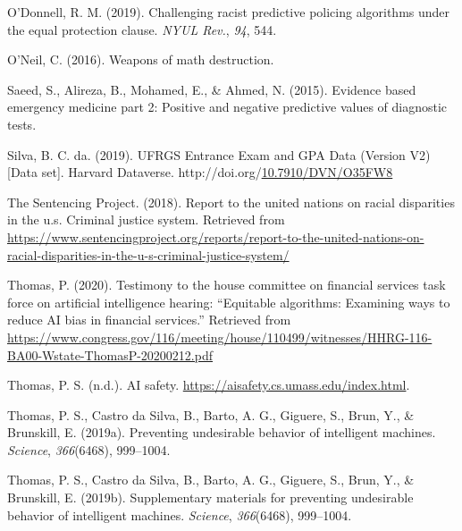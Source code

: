 \documentclass[12pt, twoside]{amherstthesis}
\newenvironment{CSLReferences}[2]%
  {}%
  {\par}
\begin{document}
\begin{CSLReferences}{1}{0}
\leavevmode{}%
O'Donnell, R. M. (2019). Challenging racist predictive policing algorithms under the equal protection clause. \emph{NYUL Rev.}, \emph{94}, 544.

\leavevmode{}%
O'Neil, C. (2016). Weapons of math destruction.

\leavevmode{}%
Saeed, S., Alireza, B., Mohamed, E., \& Ahmed, N. (2015). Evidence based emergency medicine part 2: Positive and negative predictive values of diagnostic tests.

\leavevmode{}%
Silva, B. C. da. (2019). {UFRGS Entrance Exam and GPA Data} (Version V2) {[}Data set{]}. Harvard Dataverse. http://doi.org/\href{https://doi.org/10.7910/DVN/O35FW8}{10.7910/DVN/O35FW8}

\leavevmode{}%
The Sentencing Project. (2018). Report to the united nations on racial disparities in the u.s. Criminal justice system. Retrieved from \url{https://www.sentencingproject.org/reports/report-to-the-united-nations-on-racial-disparities-in-the-u-s-criminal-justice-system/}

\leavevmode{}%
Thomas, P. (2020). Testimony to the house committee on financial services task force on artificial intelligence hearing: {``Equitable algorithms: Examining ways to reduce AI bias in financial services.''} Retrieved from \url{https://www.congress.gov/116/meeting/house/110499/witnesses/HHRG-116-BA00-Wstate-ThomasP-20200212.pdf}

\leavevmode{}%
Thomas, P. S. (n.d.). AI safety. \url{https://aisafety.cs.umass.edu/index.html}.

\leavevmode{}%
Thomas, P. S., Castro da Silva, B., Barto, A. G., Giguere, S., Brun, Y., \& Brunskill, E. (2019a). Preventing undesirable behavior of intelligent machines. \emph{Science}, \emph{366}(6468), 999--1004.

\leavevmode{}%
Thomas, P. S., Castro da Silva, B., Barto, A. G., Giguere, S., Brun, Y., \& Brunskill, E. (2019b). Supplementary materials for preventing undesirable behavior of intelligent machines. \emph{Science}, \emph{366}(6468), 999--1004.

\end{CSLReferences}
\end{document}
